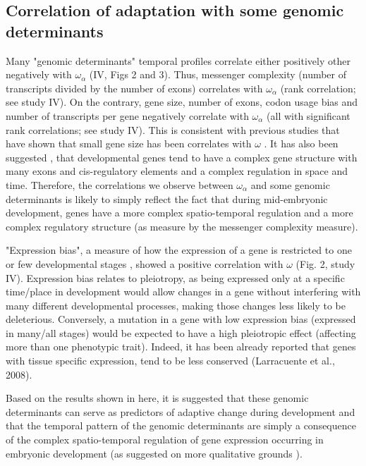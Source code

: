 \subsection{Correlation of adaptation with some genomic determinants}
Many "genomic determinants" temporal profiles correlate either positively other negatively with $\omega_{\alpha}$ (IV, Figs 2 and 3). 
%
Thus, messenger complexity (number of transcripts divided by the number of exons) correlates with $\omega_{\alpha}$ (rank correlation; see study IV). On the contrary, gene size, number of exons, codon usage bias and number of transcripts per gene negatively correlate with $\omega_{\alpha}$ (all with significant rank correlations; see study IV). 
%
This is consistent with previous studies that have shown that small gene size has been correlates with $\omega$ \citep{Duret1999,Comeron2012}.
It has also been suggested \citep{Gellon1998}, that developmental genes tend to have a complex gene structure with many exons and cis-regulatory elements and a complex regulation in space and time. Therefore, the correlations we observe between $\omega_{\alpha}$ and some genomic determinants is likely to simply reflect the fact that during mid-embryonic development, genes have a more complex spatio-temporal regulation and a more complex regulatory structure (as measure by the messenger complexity measure).

"Expression bias", a measure of how the expression of a gene is restricted to one or few developmental stages \citep{Larracuente2008}, showed a positive correlation with $\omega$ (Fig. 2, study IV). 
Expression bias relates to pleiotropy, as being expressed only at a specific time/place in development would allow changes in a gene without interfering with many different developmental processes, making those changes less likely to be deleterious. 
Conversely, a mutation in a gene with low expression bias (expressed in many/all stages) would be expected to have a high pleiotropic effect (affecting more than one phenotypic trait).  
Indeed, it has been already reported that genes with tissue specific expression, tend to be less conserved (Larracuente et al., 2008).

Based on the results shown in here, it is suggested that these genomic determinants can serve as predictors of adaptive change during development and that the temporal pattern of the genomic determinants are simply a consequence of the complex spatio-temporal regulation of gene expression occurring in embryonic 
development (as suggested on more qualitative grounds \citealp{Duboule1998}).

